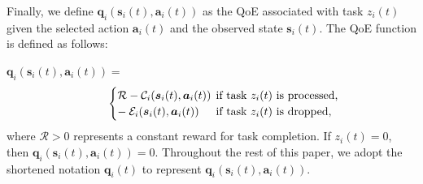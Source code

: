 \documentclass[12pt,draftclsnofoot,onecolumn]{IEEEtran}
\begin{document}
Finally, we define $\boldsymbol{q}_i(\boldsymbol{s}_i(t),\boldsymbol{a}_i(t))$ as the QoE associated with task $z_i(t)$ given the selected action $\boldsymbol{a}_i(t)$ and the observed state $\boldsymbol{s}_i(t)$. The QoE function is defined as follows:\vspace{1.7mm}

$\boldsymbol{q}_i(\boldsymbol{s}_i(t),\boldsymbol{a}_i(t)) =$
\begin{alignat}{1}
	\hspace*{8mm}
	\begin{cases} 
		\mathcal{R} - \mathcal{C}_i(\boldsymbol{s}_i(t),\boldsymbol{a}_i(t)) & \hspace*{-2mm} \text{if task $z_i(t)$ is processed,} \\
		- \hspace*{0.8mm} \mathcal{E}_i(\boldsymbol{s}_i(t),\boldsymbol{a}_i(t)) &	\hspace*{-2mm} \text{if task $z_i(t)$ is dropped,}
	\end{cases}
	\label{26}  
\end{alignat}
where $\mathcal{R} > 0$ represents a constant reward for task completion. If $z_i(t) = 0$, then $\boldsymbol{q}_i(\boldsymbol{s}_i(t), \boldsymbol{a}_i(t)) = 0$. Throughout the rest of this paper, we adopt the shortened notation $\boldsymbol{q}_i(t)$ to represent $\boldsymbol{q}_i(\boldsymbol{s}_i(t), \boldsymbol{a}_i(t))$.
\end{document}
